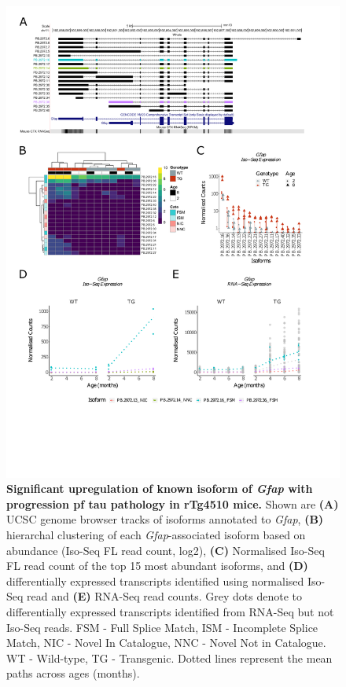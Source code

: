 \begin{figure}[!htp]
	\centering
	\includegraphics[page=1,trim={0.5cm 4.8cm 2cm 1cm}, scale = 0.85]{Figures/Ch5_DiffPlots.pdf}
	\captionsetup{width=0.95\textwidth}
	\caption[Differential \textit{Gfap} transcript expression in rTg4510 mice]%
	{\textbf{Significant upregulation of known isoform of \textit{Gfap} with progression pf tau pathology in rTg4510 mice.} Shown are \textbf{(A)} UCSC genome browser tracks of isoforms annotated to \textit{Gfap}, \textbf{(B)} hierarchal clustering of each \textit{Gfap}-associated isoform based on abundance (Iso-Seq FL read count, log2), \textbf{(C)} Normalised Iso-Seq FL read count of the top 15 most abundant isoforms, and \textbf{(D)} differentially expressed transcripts identified using normalised Iso-Seq read and \textbf{(E)} RNA-Seq read counts. Grey dots denote to differentially expressed transcripts identified from RNA-Seq but not Iso-Seq reads. FSM - Full Splice Match, ISM - Incomplete Splice Match, NIC - Novel In Catalogue, NNC - Novel Not in Catalogue. WT - Wild-type, TG - Transgenic. Dotted lines represent the mean paths across ages (months).} 
	\label{fig:DEI_gfap}
\end{figure}

